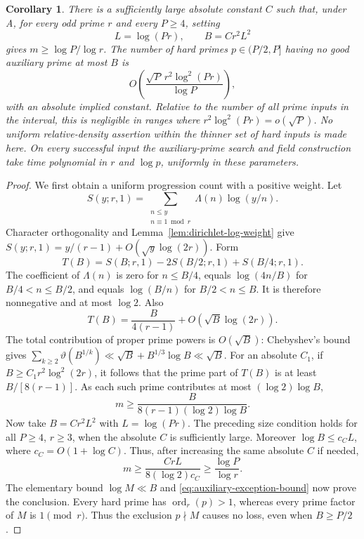 \documentclass[11pt]{article}
\newtheorem{corollary}[theorem]{Corollary}
\theoremstyle{definition}
\theoremstyle{remark}
\begin{document}
\begin{corollary}\label{cor:uniform-r-almost-all-auxiliary}
There is a sufficiently large absolute constant $C$ such that,
under A, for every odd prime $r$ and every $P\ge4$, setting
\[
 L=\log(Pr),\qquad B=C r^2L^2
\]
gives $m\ge\log P/\log r$.  The number of hard primes
$p\in(P/2,P]$ having no good auxiliary prime at most $B$ is
\[
 O\!\left(\frac{\sqrt P\,r^2\log^2(Pr)}{\log P}\right),
\]
with an absolute implied constant.  Relative to the number of all
prime inputs in the interval, this is negligible in ranges where
$r^2\log^2(Pr)=o(\sqrt P)$.  No uniform relative-density
assertion within the thinner set of hard inputs is made here.
On every successful input the auxiliary-prime search and field
construction take time polynomial in $r$ and $\log p$, uniformly
in these parameters.
\end{corollary}

\begin{proof}
We first obtain a uniform progression count with a positive weight.
Let
\[
 S(y;r,1)=\sum_{\substack{n\le y\\n\equiv1\bmod r}}
                 \Lambda(n)\log(y/n).
\]
Character orthogonality and Lemma~\ref{lem:dirichlet-log-weight}
give $S(y;r,1)=y/(r-1)+O(\sqrt y\log(2r))$.
Form
\[
 T(B)=S(B;r,1)-2S(B/2;r,1)+S(B/4;r,1).
\]
The coefficient of $\Lambda(n)$ is zero for $n\le B/4$, equals
$\log(4n/B)$ for $B/4<n\le B/2$, and equals $\log(B/n)$
for $B/2<n\le B$.  It is therefore nonnegative and at most
$\log2$.  Also
\[
 T(B)=\frac{B}{4(r-1)}+O(\sqrt B\log(2r)).
\]
The total contribution of proper prime powers is $O(\sqrt B)$:
Chebyshev's bound gives
$\sum_{k\ge2}\vartheta(B^{1/k})\ll
\sqrt B+B^{1/3}\log B\ll\sqrt B$.
For an absolute $C_1$, if $B\ge C_1r^2\log^2(2r)$, it follows
that the prime part of $T(B)$ is at least $B/[8(r-1)]$.
As each such prime contributes at most $(\log2)\log B$,
\[
 m\ge\frac{B}{8(r-1)(\log2)\log B}.
\]
Now take $B=C r^2L^2$ with $L=\log(Pr)$.
The preceding size condition holds for all $P\ge4$, $r\ge3$,
when the absolute $C$ is sufficiently large.
Moreover $\log B\le c_C L$, where $c_C=O(1+\log C)$.
Thus, after increasing the same absolute $C$ if needed,
\[
 m\ge\frac{C rL}{8(\log2)c_C}
       \ge\frac{\log P}{\log r}.
\]
The elementary bound $\log M\ll B$ and
\eqref{eq:auxiliary-exception-bound} now prove the conclusion.
Every hard prime has $\operatorname{ord}_r(p)>1$, whereas every
prime factor of $M$ is $1\pmod r$.  Thus the exclusion $p\nmid M$
causes no loss, even when $B\ge P/2$.
\end{proof}
\end{document}
